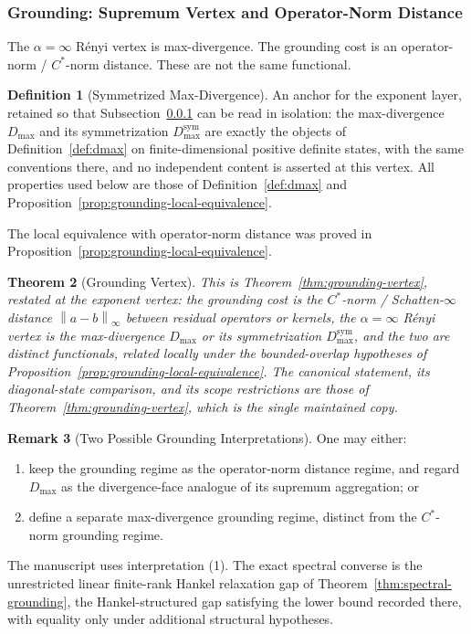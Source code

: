 \documentclass[12pt]{article}
\newtheorem{theorem}{Theorem}[section]
\theoremstyle{definition}
\newtheorem{definition}[theorem]{Definition}
\newtheorem{remark}[theorem]{Remark}
\newcommand{\norm}[1]{\left\lVert#1\right\rVert}
\newcommand{\Dmax}{D_{\max}}
\newcommand{\Dmaxsym}{D_{\max}^{\mathrm{sym}}}
\begin{document}
\subsubsection{Grounding: Supremum Vertex and Operator-Norm Distance}
\label{subsubsec:exponent-grounding}

The $\alpha=\infty$ R\'enyi vertex is max-divergence.  The grounding cost is
an operator-norm / $C^*$-norm distance.  These are not the same functional.

\begin{definition}[Symmetrized Max-Divergence]
\label{def:dmax-exponent}
An anchor for the exponent layer, retained so that
Subsection~\ref{subsubsec:exponent-grounding} can be read in isolation: the
max-divergence $\Dmax$ and its symmetrization $\Dmaxsym$ are exactly the
objects of Definition~\ref{def:dmax} on finite-dimensional positive definite
states, with the same conventions there, and no independent content is
asserted at this vertex.  All properties used below are those of
Definition~\ref{def:dmax} and
Proposition~\ref{prop:grounding-local-equivalence}.
\end{definition}

The local equivalence with operator-norm distance was proved in
Proposition~\ref{prop:grounding-local-equivalence}.

\begin{theorem}[Grounding Vertex]
\label{thm:grounding-alpha-infty}
This is Theorem~\ref{thm:grounding-vertex}, restated at the exponent vertex:
the grounding cost is the $C^*$-norm / Schatten-$\infty$ distance
$\norm{a-b}_\infty$ between residual operators or kernels, the
$\alpha=\infty$ R\'enyi vertex is the max-divergence $\Dmax$ or its
symmetrization $\Dmaxsym$, and the two are distinct functionals, related
locally under the bounded-overlap hypotheses of
Proposition~\ref{prop:grounding-local-equivalence}.  The canonical statement,
its diagonal-state comparison, and its scope restrictions are those of
Theorem~\ref{thm:grounding-vertex}, which is the single maintained copy.
\end{theorem}

\begin{remark}[Two Possible Grounding Interpretations]
\label{rem:grounding-interpretations}
One may either:
\begin{enumerate}[label=(\arabic*)]
\item keep the grounding regime as the operator-norm distance regime, and
regard $\Dmax$ as the divergence-face analogue of its supremum
aggregation; or
\item define a separate max-divergence grounding regime, distinct from the
$C^*$-norm grounding regime.
\end{enumerate}
The manuscript uses interpretation (1).  The exact spectral converse is the
unrestricted linear finite-rank Hankel relaxation gap of
Theorem~\ref{thm:spectral-grounding}, the Hankel-structured gap satisfying
the lower bound recorded there, with equality only under additional structural
hypotheses.
\end{remark}
\end{document}
